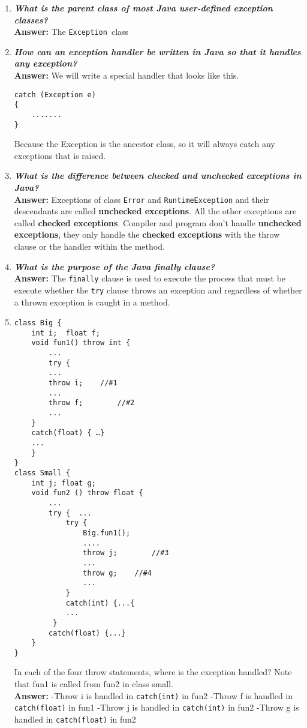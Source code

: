 \documentclass{article}
\begin{document}
\begin{enumerate}
\item 
\textbf{\textit{What is the parent class of most Java user-defined exception classes?}}\\
\textbf{Answer: } The \lstinline{Exception }class

\item 
\textbf{\textit{How can an exception handler be written in Java so that it handles any exception?}}\\
\textbf{Answer: } We will write a special handler that looks like this.
\begin{lstlisting}
catch (Exception e)
{
	.......
}
\end{lstlisting}
Because the Exception is the ancestor class, so it will always catch any exceptions that is raised.

\item 
\textbf{\textit{What is the difference between checked and unchecked exceptions in Java?}}\\
\textbf{Answer: } Exceptions of class \lstinline{Error} and \lstinline{RuntimeException} and their descendants are called \textbf{unchecked exceptions}. All the other exceptions are called \textbf{checked exceptions}. Compiler and program don't handle \textbf{unchecked exceptions}, they only handle the \textbf{checked exceptions} with the throw clause or the handler within the method.

\item 
\textbf{\textit{What is the purpose of the Java finally clause?}}\\
\textbf{Answer: } The \lstinline{finally} clause is used to execute the process that must be execute whether the \lstinline{try} clause throws an exception and regardless of whether a thrown exception is caught in a method.\\

\item 
\begin{lstlisting}
class Big {
	int i;  float f;
	void fun1() throw int { 
		...
		try {
		...
		throw i;  	//#1
		...
		throw f;		//#2
		...
	}
	catch(float) { …}
	...
	}
}
class Small {
 	int j; float g;
	void fun2 () throw float {
		...
		try {  ...
			try {
				Big.fun1();
				....
				throw j;		//#3
				...
				throw g;	//#4
				...
			}
			catch(int) {...{
			...
		 }
		catch(float) {...}
	}
}
\end{lstlisting}
In each of the four throw statements, where is the exception handled? Note that fun1 is called from fun2 in class small.\\
\textbf{Answer: }
\indent -Throw i is handled in \lstinline{catch(int)} in fun2
\indent -Throw f is handled in \lstinline{catch(float)} in fun1
\indent -Throw j is handled in \lstinline{catch(int)} in fun2
\indent -Throw g is handled in \lstinline{catch(float)} in fun2


\end{enumerate}
\end{document}
